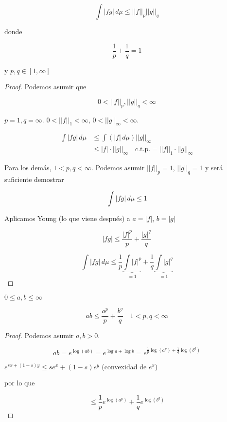 \begin{ftheorem}

    \[\int |fg|\,d\mu\leq ||f||_p ||g||_q\]

    donde

    \[\frac{1}{p}+\frac{1}{q}=1\]

    y $p,q\in [1,\infty]$
    
\end{ftheorem}

\begin{proof}
    Podemos asumir que

    \[0<||f||_p,||g||_q<\infty\]

    $p=1,q=\infty$. $0<||f||_1<\infty$, $0<||g||_\infty<\infty$.

    \begin{align*}
        \int |fg|\,d\mu&\leq \int(|f|\,d\mu)||g||_\infty\\
        &\leq |f|\cdot ||g||_\infty \quad \text{c.t.p.}=||f||_1\cdot ||g||_\infty
    \end{align*}

    Para los demás, $1<p,q<\infty$. Podemos asumir $||f||_p=1$, $||g||_q=1$ y será suficiente demostrar 

    \[\int |fg|\,d\mu\leq 1\]

    Aplicamos Young (lo que viene después) a $a=|f|$, $b=|g|$

    \[|fg|\leq \frac{|f|^p}{p}+\frac{|g|^q}{q}\]

    \[\int |fg|\,d\mu\leq \frac{1}{p}\underbrace{\int |f|^p}_{=1}+\frac{1}{q}\underbrace{\int |g|^q}_{=1}\]
\end{proof}

\begin{ftheorem}
    $0\leq a,b\leq \infty$

    \[ab\leq \frac{a^p}{p}+\frac{b^q}{q}\quad 1<p,q<\infty\]
\end{ftheorem}

\begin{proof}
    Podemos asumir $a,b>0$.

    \[ab=e^{\log (ab)}=e^{\log a+\log b}=e^{\frac{1}{p}\log (a^p)+\frac{1}{q}\log (b^q)}\]

    $e^{sx+(1-s)y}\leq se^{x}+(1-s)e^y$ (convexidad de $e^x$)

    por lo que 

    \[\leq \frac{1}{p}e^{\log (a^p)}+\frac{1}{q}e^{\log(b^q)}\]
\end{proof}

